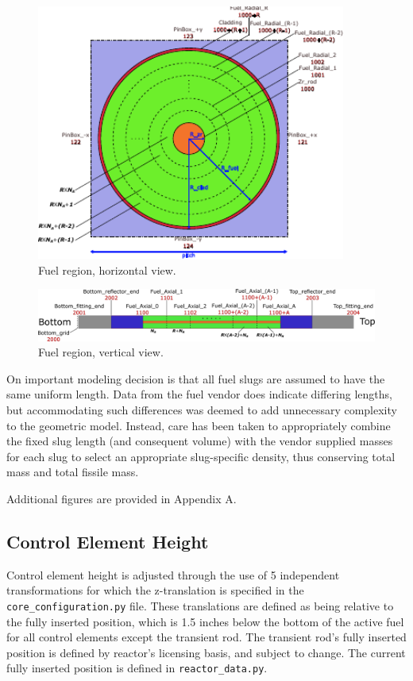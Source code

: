 \documentclass{UWNR_modeling}
\begin{document}
\begin{figure}[H]
  \centering
  \includegraphics[width=4in]{fuel_xy.pdf}
  \caption{Fuel region, horizontal view.}
  \label{fig:fuel_xy}
\end{figure}

\begin{figure}[H]
  \centering
  \includegraphics[width=7in]{fuel_yz.pdf}
  \caption{Fuel region, vertical view.}
  \label{fig:fuel_yz}
\end{figure}

On important modeling decision is that all fuel slugs are assumed to have the
same uniform length.  Data from the fuel vendor does indicate differing
lengths, but accommodating such differences was deemed to add unnecessary
complexity to the geometric model.  Instead, care has been taken to
appropriately combine the fixed slug length (and consequent volume) with the
vendor supplied masses for each slug to select an appropriate slug-specific
density, thus conserving total mass and total fissile mass.

Additional figures are provided in Appendix A.

\subsection{Control Element Height}

Control element height is adjusted through the use of 5 independent
transformations for which the z-translation is specified in the
\texttt{core\_configuration.py} file.  These translations are defined as being
relative to the fully inserted position, which is 1.5 inches below the bottom
of the active fuel for all control elements except the transient rod.  The
transient rod's fully inserted position is defined by reactor's licensing
basis, and subject to change.  The current fully inserted position is defined
in \texttt{reactor\_data.py}.
\end{document}
